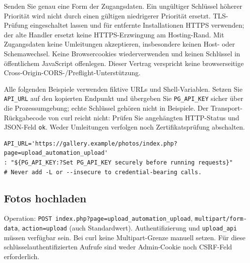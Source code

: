 \documentclass[11pt,a4paper]{article}
\newcommand{\codeword}[1]{\nolinkurl{#1}}
\begin{document}
Senden Sie genau eine Form der Zugangsdaten. Ein ungültiger Schlüssel höherer Priorität wird
nicht durch einen gültigen niedrigerer Priorität ersetzt. TLS-Prüfung eingeschaltet lassen
und für entfernte Installationen HTTPS verwenden; der alte Handler ersetzt keine
HTTPS-Erzwingung am Hosting-Rand. Mit Zugangsdaten keine Umleitungen akzeptieren,
insbesondere keinen Host- oder Schemawechsel. Keine Browsercookies wiederverwenden und
keinen Schlüssel in öffentlichem JavaScript offenlegen. Dieser Vertrag verspricht keine
browserseitige Cross-Origin-CORS-/Preflight-Unterstützung.

Alle folgenden Beispiele verwenden fiktive URLs und Shell-Variablen. Setzen Sie
\codeword{API_URL} auf den kopierten Endpunkt und übergeben Sie \codeword{PG_API_KEY} sicher
über die Prozessumgebung; echte Schlüssel gehören nicht in Beispiele. Der
Transport-Rückgabecode von curl reicht nicht: Prüfen Sie angehängten HTTP-Status und
JSON-Feld \codeword{ok}. Weder Umleitungen verfolgen noch Zertifikatsprüfung abschalten.

\begin{lstlisting}[language={}]
API_URL='https://gallery.example/photos/index.php?page=upload_automation_upload'
: "${PG_API_KEY:?Set PG_API_KEY securely before running requests}"
# Never add -L or --insecure to credential-bearing calls.
\end{lstlisting}

\subsection{\texorpdfstring{Fotos hochladen}{Fotos hochladen}}

\label{api352:upload}

Operation: \codeword{POST index.php?page=upload_automation_upload},
\codeword{multipart/form-data}, \codeword{action=upload} (auch Standardwert).
Authentifizierung und \codeword{upload_api} müssen verfügbar sein. Bei curl keine
Multipart-Grenze manuell setzen. Für diese schlüsselauthentifizierten Aufrufe sind weder
Admin-Cookie noch CSRF-Feld erforderlich.
\end{document}
